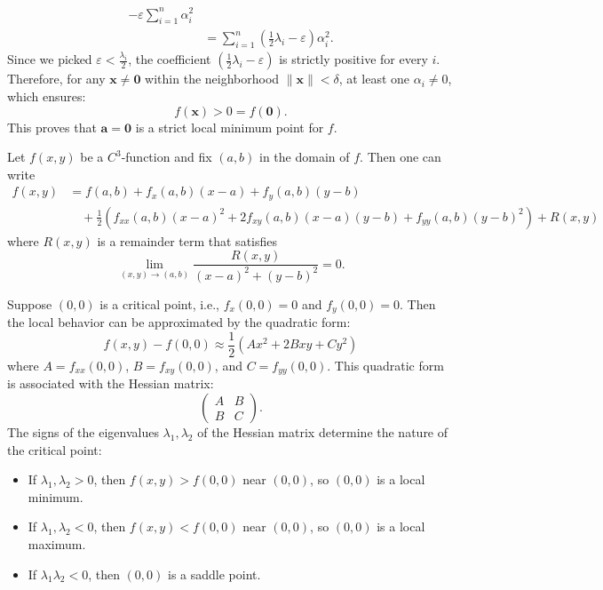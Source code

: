 \begin{pfbox}
\begin{align*}
		- \varepsilon\sum_{i=1}^n \alpha_i^2                                       \\
		 & = \sum_{i=1}^n \left(\frac{1}{2}\lambda_i-\varepsilon\right)\alpha_i^2.
	\end{align*}
	Since we picked $\varepsilon < \frac{\lambda_i}{2}$, the coefficient $\left(\frac{1}{2}\lambda_i - \varepsilon\right)$ is strictly positive for every $i$. Therefore, for any $\mathbf{x} \ne \mathbf{0}$ within the neighborhood $\|\mathbf{x}\| < \delta$, at least one $\alpha_i \ne 0$, which ensures:
	$$
		f(\mathbf{x}) > 0 = f(\mathbf{0}).
	$$
	This proves that $\mathbf{a} = \mathbf{0}$ is a strict local minimum point for $f$.
\end{pfbox}

\begin{example}
	Let $f(x,y)$ be a $C^3$-function and fix $(a,b)$ in the domain of $f$. Then one can write
	\begin{align*}
		f(x,y) & = f(a,b) + f_x(a,b)(x-a) + f_y(a,b)(y-b)                                                                  \\
		       & \quad + \frac{1}{2}\left(f_{xx}(a,b)(x-a)^2 + 2f_{xy}(a,b)(x-a)(y-b) + f_{yy}(a,b)(y-b)^2\right) + R(x,y)
	\end{align*}
	where $R(x,y)$ is a remainder term that satisfies
	$$
		\lim_{(x,y)\to(a,b)} \frac{R(x,y)}{(x-a)^2 + (y-b)^2} = 0.
	$$
\end{example}

Suppose $(0,0)$ is a critical point, i.e., $f_x(0,0) = 0$ and $f_y(0,0) = 0$. Then the local behavior can be approximated by the quadratic form:
$$
	f(x,y) - f(0,0) \approx \frac{1}{2}\left(Ax^2 + 2Bxy + Cy^2\right)
$$
where $A = f_{xx}(0,0)$, $B = f_{xy}(0,0)$, and $C = f_{yy}(0,0)$. This quadratic form is associated with the Hessian matrix:
\[
	\begin{pmatrix} A & B \\ B & C \end{pmatrix}.
\]
The signs of the eigenvalues $\lambda_1, \lambda_2$ of the Hessian matrix determine the nature of the critical point:
\begin{itemize}
	\item If $\lambda_1, \lambda_2 > 0$, then $f(x,y) > f(0,0)$ near $(0,0)$, so $(0,0)$ is a local minimum.
	\item If $\lambda_1, \lambda_2 < 0$, then $f(x,y) < f(0,0)$ near $(0,0)$, so $(0,0)$ is a local maximum.
	\item If $\lambda_1 \lambda_2 < 0$, then $(0,0)$ is a saddle point.
\end{itemize}

